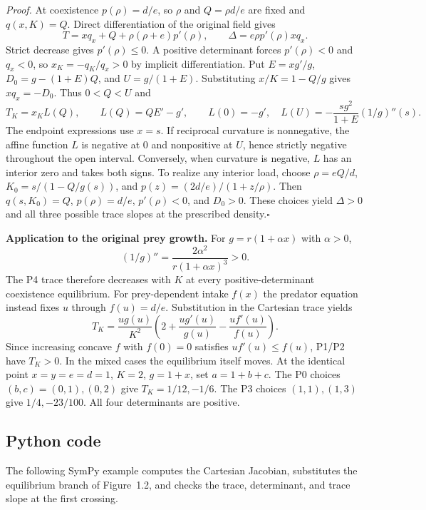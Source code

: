 \medskip\noindent\textit{Proof.}
At coexistence $p(\rho)=d/e$, so $\rho$ and $Q=\rho d/e$ are fixed and $q(x,K)=Q$. Direct differentiation of the original field gives
\[
 T=xq_x+Q+\rho(\rho+e)p'(\rho),\qquad
 \Delta=e\rho p'(\rho)xq_x .
\]
Strict decrease gives $p'(\rho)\le0$. A positive determinant forces $p'(\rho)<0$ and $q_x<0$, so $x_K=-q_K/q_x>0$ by implicit differentiation. Put $E=xg'/g$, $D_0=g-(1+E)Q$, and $U=g/(1+E)$. Substituting $x/K=1-Q/g$ gives $xq_x=-D_0$. Thus $0<Q<U$ and
\[
 T_K=x_KL(Q),\qquad L(Q)=QE'-g',\qquad
 L(0)=-g',\quad L(U)=-\frac{s g^2}{1+E}(1/g)''(s).
\]
The endpoint expressions use $x=s$. If reciprocal curvature is nonnegative, the affine function $L$ is negative at $0$ and nonpositive at $U$, hence strictly negative throughout the open interval. Conversely, when curvature is negative, $L$ has an interior zero and takes both signs. To realize any interior load, choose $\rho=eQ/d$, $K_0=s/(1-Q/g(s))$, and $p(z)=(2d/e)/(1+z/\rho)$. Then $q(s,K_0)=Q$, $p(\rho)=d/e$, $p'(\rho)<0$, and $D_0>0$. These choices yield $\Delta>0$ and all three possible trace slopes at the prescribed density.\hfill$\square$

\clearpage
\textbf{Application to the original prey growth.}
For $g=r(1+\alpha x)$ with $\alpha>0$,
\[
 (1/g)''=\frac{2\alpha^2}{r(1+\alpha x)^3}>0.
\]
The P4 trace therefore decreases with $K$ at every positive-determinant coexistence equilibrium. For prey-dependent intake $f(x)$ the predator equation instead fixes $u$ through $f(u)=d/e$. Substitution in the Cartesian trace yields
\[
 T_K=\frac{u g(u)}{K^2}\left(2+\frac{u g'(u)}{g(u)}-\frac{u f'(u)}{f(u)}\right).
\]
Since increasing concave $f$ with $f(0)=0$ satisfies $uf'(u)\le f(u)$, P1/P2 have $T_K>0$. In the mixed cases the equilibrium itself moves. At the identical point $x=y=e=d=1$, $K=2$, $g=1+x$, set $a=1+b+c$. The P0 choices $(b,c)=(0,1),(0,2)$ give $T_K=1/12,-1/6$. The P3 choices $(1,1),(1,3)$ give $1/4,-23/100$. All four determinants are positive.

\subsection*{Python code}
The following SymPy example computes the Cartesian Jacobian, substitutes the equilibrium branch of Figure~1.2, and checks the trace, determinant, and trace slope at the first crossing.

